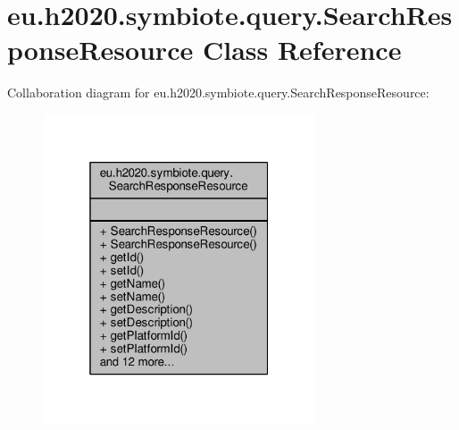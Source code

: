 \hypertarget{classeu_1_1h2020_1_1symbiote_1_1query_1_1SearchResponseResource}{}\section{eu.\+h2020.\+symbiote.\+query.\+Search\+Response\+Resource Class Reference}
\label{classeu_1_1h2020_1_1symbiote_1_1query_1_1SearchResponseResource}


Collaboration diagram for eu.\+h2020.\+symbiote.\+query.\+Search\+Response\+Resource\+:
\nopagebreak
\begin{figure}[H]
\begin{center}
\leavevmode
\includegraphics[width=229pt]{classeu_1_1h2020_1_1symbiote_1_1query_1_1SearchResponseResource__coll__graph}
\end{center}
\end{figure}
